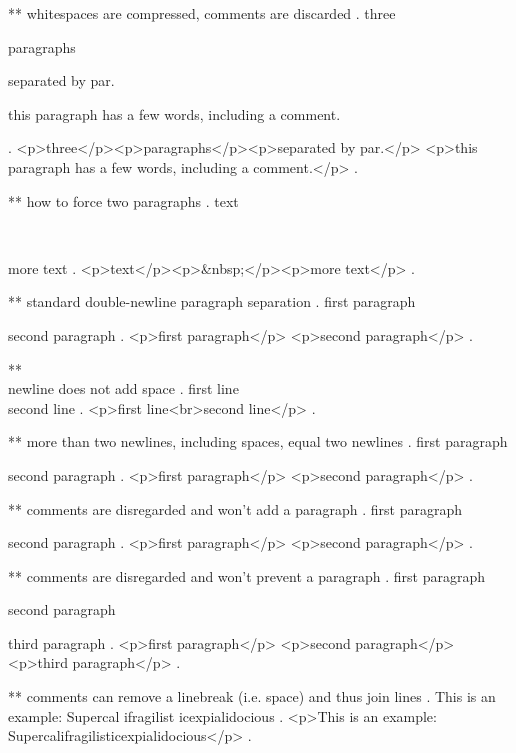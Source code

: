** whitespaces are compressed, comments are discarded
.
three
\par

paragraphs
    \par\par
 separated by par.

   this     paragraph  has a 	    few 
 words,   including
 a comment.


 
.
<p>three</p><p>paragraphs</p><p>separated by par.</p>
<p>this paragraph has a few words, including a comment.</p>
.


** how to force two paragraphs
.
text  \par
~
\par
more text
.
<p>text</p><p>&nbsp;</p><p>more text</p>
.


** standard double-newline paragraph separation
.
first paragraph

 second paragraph
.
<p>ﬁrst paragraph</p>
<p>second paragraph</p>
.

** \\ newline does not add space
.
first line \\
 second line
.
<p>ﬁrst line<br>second line</p>
.



** more than two newlines, including spaces, equal two newlines
.
first paragraph

   
  


second paragraph
.
<p>ﬁrst paragraph</p>
<p>second paragraph</p>
.


** comments are disregarded and won't add a paragraph
.
first paragraph




second paragraph
.
<p>ﬁrst paragraph</p>
<p>second paragraph</p>
.

** comments are disregarded and won't prevent a paragraph
.
first paragraph %

second paragraph%

third paragraph
.
<p>ﬁrst paragraph</p>
<p>second paragraph</p>
<p>third paragraph</p>
.


** comments can remove a linebreak (i.e. space) and thus join lines
.
This is an %
example: Supercal%
              ifragilist%
    icexpialidocious
.
<p>This is an example: Supercalifragilisticexpialidocious</p>
.



